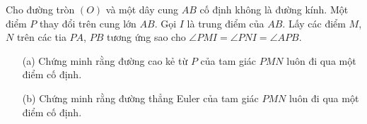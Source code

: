     \begin{problem}
        Cho đường tròn \((O)\) và một dây cung \(AB\) cố định không là đường kính. Một điểm \(P\) thay đổi trên cung lớn \(AB\). Gọi \(I\) là trung điểm của \(AB\). Lấy các điểm \(M\), \(N\) trên các tia \(PA\), \(PB\) tương ứng sao cho \(\angle PMI = \angle PNI = \angle APB\).
        \begin{enumerate}
            \item[(a)] Chứng minh rằng đường cao kẻ từ \(P\) của tam giác \(PMN\) luôn đi qua một điểm cố định.
            \item[(b)] Chứng minh rằng đường thẳng Euler của tam giác \(PMN\) luôn đi qua một điểm cố định.
        \end{enumerate}
    \end{problem}

